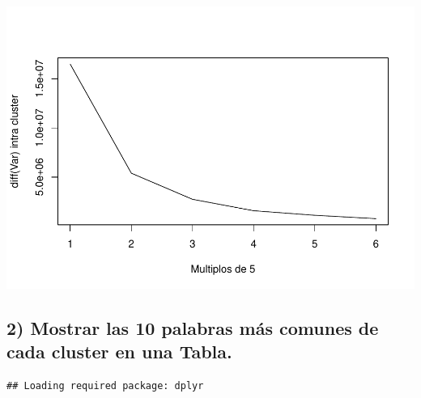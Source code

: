 \documentclass[
]{article}
\newenvironment{Shaded}{\begin{snugshade}}{\end{snugshade}}
\newcommand{\DataTypeTok}[1]{\textcolor[rgb]{0.13,0.29,0.53}{#1}}
\newcommand{\DecValTok}[1]{\textcolor[rgb]{0.00,0.00,0.81}{#1}}
\newcommand{\KeywordTok}[1]{\textcolor[rgb]{0.13,0.29,0.53}{\textbf{#1}}}
\newcommand{\NormalTok}[1]{#1}
\newcommand{\OperatorTok}[1]{\textcolor[rgb]{0.81,0.36,0.00}{\textbf{#1}}}
\newcommand{\OtherTok}[1]{\textcolor[rgb]{0.56,0.35,0.01}{#1}}
\newcommand{\StringTok}[1]{\textcolor[rgb]{0.31,0.60,0.02}{#1}}
\begin{document}
\includegraphics{ReporteKmeansOnlineJessVega_files/figure-latex/q1-2.pdf}

\hypertarget{mostrar-las-10-palabras-muxe1s-comunes-de-cada-cluster-en-una-tabla.}{%
\subsection{2) Mostrar las 10 palabras más comunes de cada cluster en
una
Tabla.}\label{mostrar-las-10-palabras-muxe1s-comunes-de-cada-cluster-en-una-tabla.}}

\begin{Shaded}
\end{Shaded}

\begin{verbatim}
## Loading required package: dplyr
\end{verbatim}
\end{document}

